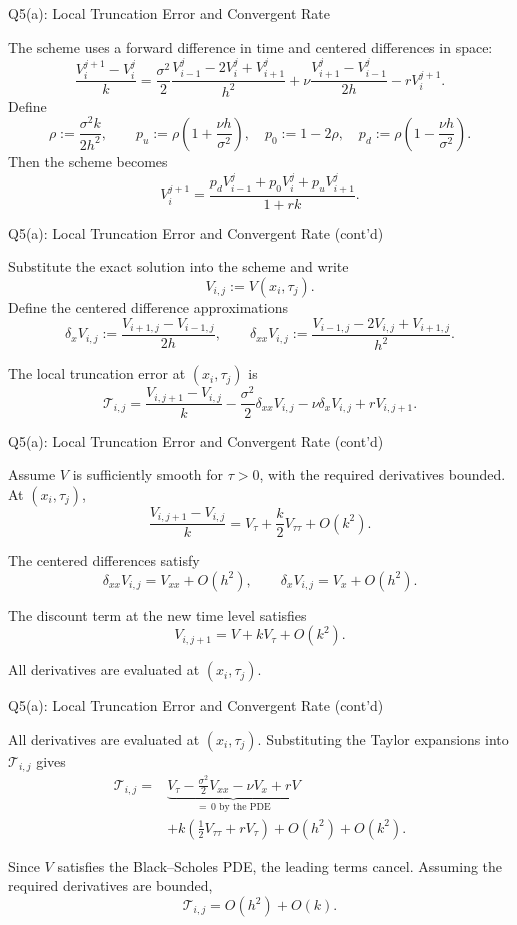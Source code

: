 \documentclass{beamer}
\begin{document}
\begin{frame}{Q5(a): Local Truncation Error and Convergent Rate}

The scheme uses a forward difference in time and centered differences
in space:
\[
\frac{V_i^{j+1}-V_i^j}{k}
=
\frac{\sigma^2}{2}
\frac{V_{i-1}^j-2V_i^j+V_{i+1}^j}{h^2}
+\nu\frac{V_{i+1}^j-V_{i-1}^j}{2h}
-rV_i^{j+1}.
\]
Define
\[
\rho:=\frac{\sigma^2 k}{2h^2},\qquad
p_u:=\rho\left(1+\frac{\nu h}{\sigma^2}\right),\quad
p_0:=1-2\rho,\quad
p_d:=\rho\left(1-\frac{\nu h}{\sigma^2}\right).
\]
Then the scheme becomes
\[
V_i^{j+1}
=
\frac{p_dV_{i-1}^j+p_0V_i^j+p_uV_{i+1}^j}{1+rk}.
\]
    
\end{frame}

\begin{frame}{Q5(a): Local Truncation Error and Convergent Rate (cont'd)}

Substitute the exact solution into the scheme and write
\[
V_{i,j}:=V(x_i,\tau_j).
\]
Define the centered difference approximations
\[
\delta_x V_{i,j}
:=\frac{V_{i+1,j}-V_{i-1,j}}{2h},
\qquad
\delta_{xx}V_{i,j}
:=\frac{V_{i-1,j}-2V_{i,j}+V_{i+1,j}}{h^2}.
\]

The local truncation error at $(x_i,\tau_j)$ is
\[
\mathcal{T}_{i,j}
=
\frac{V_{i,j+1}-V_{i,j}}{k}
-\frac{\sigma^2}{2}\delta_{xx}V_{i,j}
-\nu\delta_xV_{i,j}
+rV_{i,j+1}.
\]

\end{frame}

\begin{frame}{Q5(a): Local Truncation Error and Convergent Rate (cont'd)}

Assume $V$ is sufficiently smooth for $\tau>0$, with the required
derivatives bounded. At $(x_i,\tau_j)$,
\[
\frac{V_{i,j+1}-V_{i,j}}{k}
=
V_\tau+\frac{k}{2}V_{\tau\tau}+O(k^2).
\]

The centered differences satisfy
\[
\delta_{xx}V_{i,j}=V_{xx}+O(h^2),
\qquad
\delta_xV_{i,j}=V_x+O(h^2).
\]

The discount term at the new time level satisfies
\[
V_{i,j+1}=V+kV_\tau+O(k^2).
\]

All derivatives are evaluated at $(x_i,\tau_j)$.

\end{frame}


\begin{frame}{Q5(a): Local Truncation Error and Convergent Rate (cont'd)}

All derivatives are evaluated at $(x_i,\tau_j)$. Substituting the
Taylor expansions into $\mathcal{T}_{i,j}$ gives
\[
\begin{aligned}
\mathcal{T}_{i,j}
={}&
\underbrace{V_\tau-\frac{\sigma^2}{2}V_{xx}-\nu V_x+rV}_{=\,0\text{ by the PDE}}\\
&+k\left(\frac12V_{\tau\tau}+rV_\tau\right)
+O(h^2)+O(k^2).
\end{aligned}
\]

Since $V$ satisfies the Black--Scholes PDE, the leading terms cancel.
Assuming the required derivatives are bounded,
\[
\boxed{\mathcal{T}_{i,j}=O(h^2)+O(k).}
\]

\end{frame}
\end{document}

